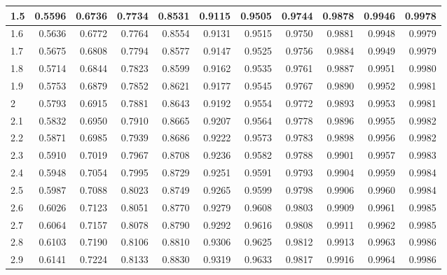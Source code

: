 \documentclass[
]{book}
\theoremstyle{definition}
\theoremstyle{definition}
\theoremstyle{definition}
\theoremstyle{definition}
\theoremstyle{remark}
\begin{document}
\begin{table}
\begin{tabular}[t]{l|r|r|r|r|r|r|r|r|r|r}
\hline
1.5 & 0.5596 & 0.6736 & 0.7734 & 0.8531 & 0.9115 & 0.9505 & 0.9744 & 0.9878 & 0.9946 & 0.9978\\
\hline
1.6 & 0.5636 & 0.6772 & 0.7764 & 0.8554 & 0.9131 & 0.9515 & 0.9750 & 0.9881 & 0.9948 & 0.9979\\
\hline
1.7 & 0.5675 & 0.6808 & 0.7794 & 0.8577 & 0.9147 & 0.9525 & 0.9756 & 0.9884 & 0.9949 & 0.9979\\
\hline
1.8 & 0.5714 & 0.6844 & 0.7823 & 0.8599 & 0.9162 & 0.9535 & 0.9761 & 0.9887 & 0.9951 & 0.9980\\
\hline
1.9 & 0.5753 & 0.6879 & 0.7852 & 0.8621 & 0.9177 & 0.9545 & 0.9767 & 0.9890 & 0.9952 & 0.9981\\
\hline
2 & 0.5793 & 0.6915 & 0.7881 & 0.8643 & 0.9192 & 0.9554 & 0.9772 & 0.9893 & 0.9953 & 0.9981\\
\hline
2.1 & 0.5832 & 0.6950 & 0.7910 & 0.8665 & 0.9207 & 0.9564 & 0.9778 & 0.9896 & 0.9955 & 0.9982\\
\hline
2.2 & 0.5871 & 0.6985 & 0.7939 & 0.8686 & 0.9222 & 0.9573 & 0.9783 & 0.9898 & 0.9956 & 0.9982\\
\hline
2.3 & 0.5910 & 0.7019 & 0.7967 & 0.8708 & 0.9236 & 0.9582 & 0.9788 & 0.9901 & 0.9957 & 0.9983\\
\hline
2.4 & 0.5948 & 0.7054 & 0.7995 & 0.8729 & 0.9251 & 0.9591 & 0.9793 & 0.9904 & 0.9959 & 0.9984\\
\hline
2.5 & 0.5987 & 0.7088 & 0.8023 & 0.8749 & 0.9265 & 0.9599 & 0.9798 & 0.9906 & 0.9960 & 0.9984\\
\hline
2.6 & 0.6026 & 0.7123 & 0.8051 & 0.8770 & 0.9279 & 0.9608 & 0.9803 & 0.9909 & 0.9961 & 0.9985\\
\hline
2.7 & 0.6064 & 0.7157 & 0.8078 & 0.8790 & 0.9292 & 0.9616 & 0.9808 & 0.9911 & 0.9962 & 0.9985\\
\hline
2.8 & 0.6103 & 0.7190 & 0.8106 & 0.8810 & 0.9306 & 0.9625 & 0.9812 & 0.9913 & 0.9963 & 0.9986\\
\hline
2.9 & 0.6141 & 0.7224 & 0.8133 & 0.8830 & 0.9319 & 0.9633 & 0.9817 & 0.9916 & 0.9964 & 0.9986\\
\hline
\end{tabular}
\end{table}
\end{document}
